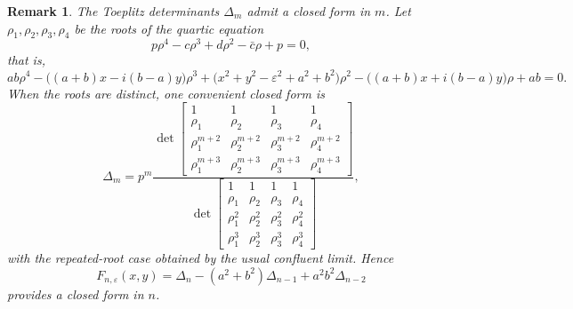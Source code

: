 \documentclass[11pt]{article}
\newtheorem{remark}[theorem]{Remark}
\begin{document}
\begin{remark}\label{rem:quartic-closed-form}
The Toeplitz determinants $\Delta_m$ admit a closed form in $m$. Let
$\rho_1,\rho_2,\rho_3,\rho_4$ be the roots of the quartic equation
\[
p\rho^4-c\rho^3+d\rho^2-\bar c\rho+p=0,
\]
that is,
\[
ab\rho^4-\bigl((a+b)x-i(b-a)y\bigr)\rho^3
+\bigl(x^2+y^2-\varepsilon^2+a^2+b^2\bigr)\rho^2
-\bigl((a+b)x+i(b-a)y\bigr)\rho
+ab=0.
\]
When the roots are distinct, one convenient closed form is
\[
\Delta_m
=p^m
\frac{
\det
\begin{bmatrix}
1&1&1&1\\
\rho_1&\rho_2&\rho_3&\rho_4\\
\rho_1^{m+2}&\rho_2^{m+2}&\rho_3^{m+2}&\rho_4^{m+2}\\
\rho_1^{m+3}&\rho_2^{m+3}&\rho_3^{m+3}&\rho_4^{m+3}
\end{bmatrix}
}{
\det
\begin{bmatrix}
1&1&1&1\\
\rho_1&\rho_2&\rho_3&\rho_4\\
\rho_1^2&\rho_2^2&\rho_3^2&\rho_4^2\\
\rho_1^3&\rho_2^3&\rho_3^3&\rho_4^3
\end{bmatrix}
},
\]
with the repeated-root case obtained by the usual confluent limit. Hence
\[
F_{n,\varepsilon}(x,y)
=\Delta_n-(a^2+b^2)\Delta_{n-1}+a^2b^2\Delta_{n-2}
\]
provides a closed form in $n$.
\end{remark}
\end{document}
